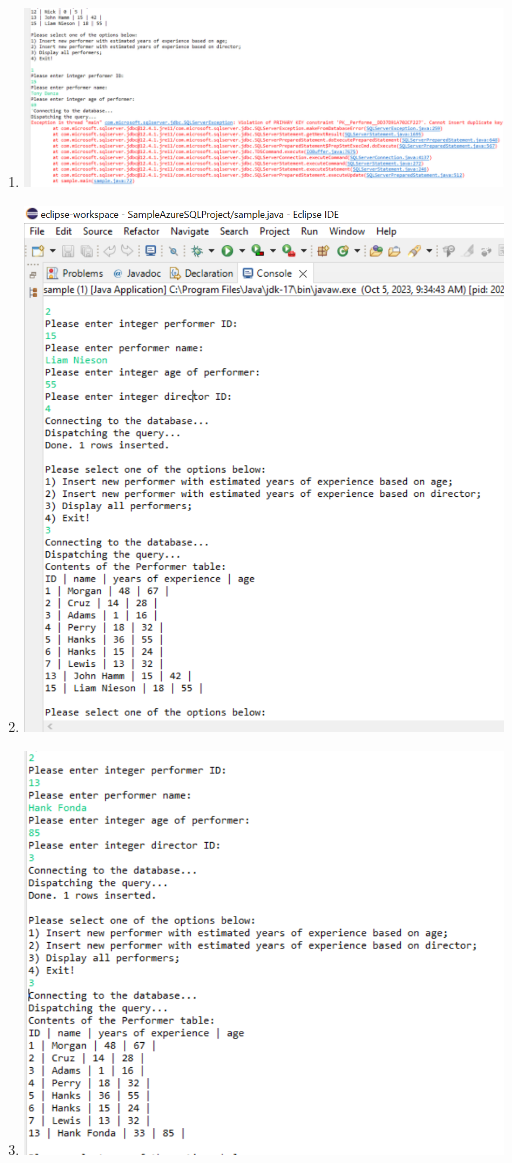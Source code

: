 \documentclass[11pt]{article}
\begin{document}
\begin{enumerate}
\item \includegraphics[width = \textwidth]{Insert1.2.DuplicateKeyError.png}  

\item \includegraphics[width = \textwidth]{Insert2.png}
\item \includegraphics[width = \textwidth]{Insert2.1.png} 

\end{enumerate}
\end{document}

